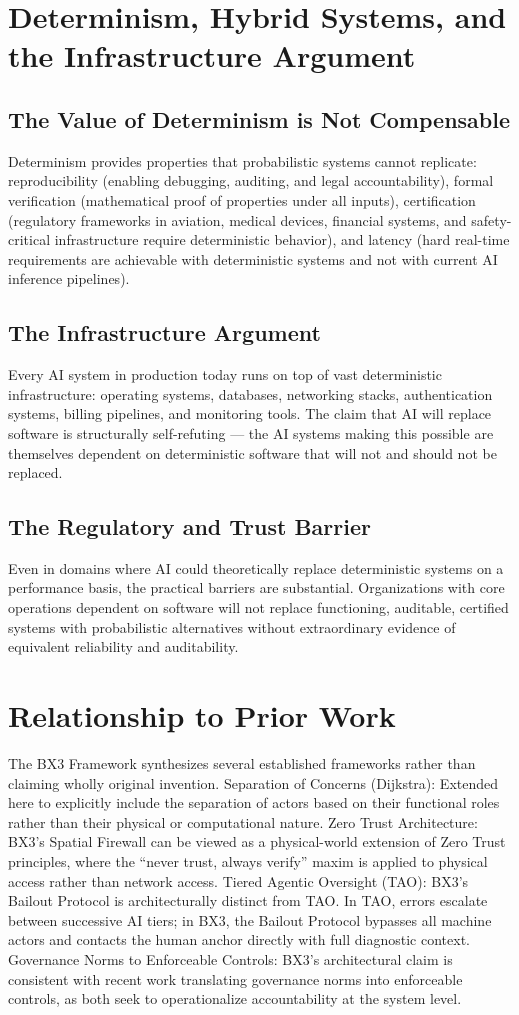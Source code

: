 \documentclass[11pt, a4paper]{article}
\begin{document}
\section{Determinism, Hybrid Systems, and the Infrastructure Argument}
\subsection{The Value of Determinism is Not Compensable}
Determinism provides properties that probabilistic systems cannot replicate: reproducibility (enabling debugging, auditing, and legal accountability), formal verification (mathematical proof of properties under all inputs), certification (regulatory frameworks in aviation, medical devices, financial systems, and safety-critical infrastructure require deterministic behavior), and latency (hard real-time requirements are achievable with deterministic systems and not with current AI inference pipelines).
\subsection{The Infrastructure Argument}
Every AI system in production today runs on top of vast deterministic infrastructure: operating systems, databases, networking stacks, authentication systems, billing pipelines, and monitoring tools. The claim that AI will replace software is structurally self-refuting --- the AI systems making this possible are themselves dependent on deterministic software that will not and should not be replaced.
\subsection{The Regulatory and Trust Barrier}
Even in domains where AI could theoretically replace deterministic systems on a performance basis, the practical barriers are substantial. Organizations with core operations dependent on software will not replace functioning, auditable, certified systems with probabilistic alternatives without extraordinary evidence of equivalent reliability and auditability.
\section{Relationship to Prior Work}
The BX3 Framework synthesizes several established frameworks rather than claiming wholly original invention. Separation of Concerns (Dijkstra): Extended here to explicitly include the separation of actors based on their functional roles rather than their physical or computational nature. Zero Trust Architecture: BX3's Spatial Firewall can be viewed as a physical-world extension of Zero Trust principles, where the ``never trust, always verify'' maxim is applied to physical access rather than network access. Tiered Agentic Oversight (TAO): BX3's Bailout Protocol is architecturally distinct from TAO. In TAO, errors escalate between successive AI tiers; in BX3, the Bailout Protocol bypasses all machine actors and contacts the human anchor directly with full diagnostic context. Governance Norms to Enforceable Controls: BX3's architectural claim is consistent with recent work translating governance norms into enforceable controls, as both seek to operationalize accountability at the system level.
\end{document}
